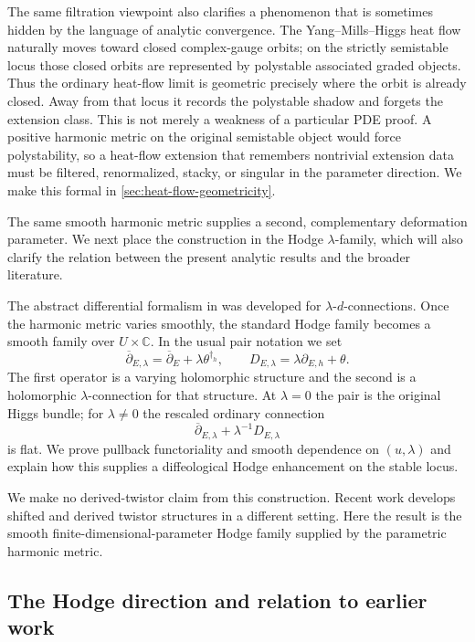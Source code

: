 \documentclass[11pt,reqno]{amsart}
\theoremstyle{definition}
\theoremstyle{remark}
\newcommand{\C}{\mathbb C}
\newcommand{\ddbar}{\overline\partial}
\begin{document}
The same filtration viewpoint also clarifies a phenomenon that is sometimes hidden by the language of analytic convergence.  The Yang--Mills--Higgs heat flow naturally moves toward closed complex-gauge orbits; on the strictly semistable locus those closed orbits are represented by polystable associated graded objects.  Thus the ordinary heat-flow limit is geometric precisely where the orbit is already closed.  Away from that locus it records the polystable shadow and forgets the extension class.  This is not merely a weakness of a particular PDE proof.  A positive harmonic metric on the original semistable object would force polystability, so a heat-flow extension that remembers nontrivial extension data must be filtered, renormalized, stacky, or singular in the parameter direction.  We make this formal in \cref{sec:heat-flow-geometricity}.

The same smooth harmonic metric supplies a second, complementary deformation parameter.  We next place the construction in the Hodge $\lambda$-family, which will also clarify the relation between the present analytic results and the broader literature.


The abstract differential formalism in \cite{AzamRayan2026} was developed for $\lambda$-$d$-connections.  Once the harmonic metric varies smoothly, the standard Hodge family becomes a smooth family over $U\times\C$.  In the usual pair notation we set
\begin{equation}\label{eq:intro-lambda}
  \ddbar_{E,\lambda}=\ddbar_E+\lambda\theta^{\dagger_h},
  \qquad
  D_{E,\lambda}=\lambda\partial_{E,h}+\theta.
\end{equation}
The first operator is a varying holomorphic structure and the second is a holomorphic $\lambda$-connection for that structure.  At $\lambda=0$ the pair is the original Higgs bundle; for $\lambda\ne0$ the rescaled ordinary connection
\[
  \ddbar_{E,\lambda}+\lambda^{-1}D_{E,\lambda}
\]
is flat.  We prove pullback functoriality and smooth dependence on $(u,\lambda)$ and explain how this supplies a diffeological Hodge enhancement on the stable locus.

We make no derived-twistor claim from this construction.  Recent work develops shifted and derived twistor structures in a different setting.  Here the result is the smooth finite-dimensional-parameter Hodge family supplied by the parametric harmonic metric.

\subsection{The Hodge direction and relation to earlier work}\label{sec:literature-positioning}
\end{document}

